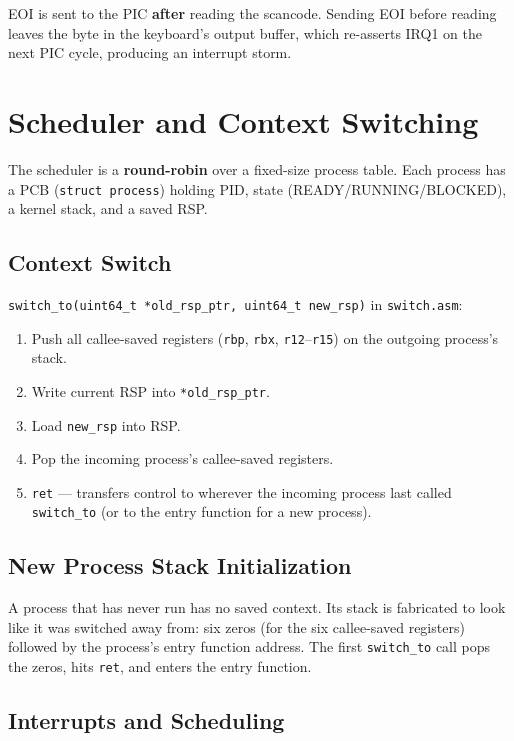 \documentclass[12pt,a4paper]{article}
\begin{document}
EOI is sent to the PIC \textbf{after} reading the scancode. Sending EOI before reading leaves the byte in the keyboard's output buffer, which re-asserts IRQ1 on the next PIC cycle, producing an interrupt storm.

\section{Scheduler and Context Switching}

The scheduler is a \textbf{round-robin} over a fixed-size process table. Each process has a PCB (\texttt{struct process}) holding PID, state (READY/RUNNING/BLOCKED), a kernel stack, and a saved RSP.

\subsection{Context Switch}

\texttt{switch\_to(uint64\_t *old\_rsp\_ptr, uint64\_t new\_rsp)} in \texttt{switch.asm}:

\begin{enumerate}
    \item Push all callee-saved registers (\texttt{rbp}, \texttt{rbx}, \texttt{r12}--\texttt{r15}) on the outgoing process's stack.
    \item Write current RSP into \texttt{*old\_rsp\_ptr}.
    \item Load \texttt{new\_rsp} into RSP.
    \item Pop the incoming process's callee-saved registers.
    \item \texttt{ret} --- transfers control to wherever the incoming process last called \texttt{switch\_to} (or to the entry function for a new process).
\end{enumerate}

\subsection{New Process Stack Initialization}

A process that has never run has no saved context. Its stack is fabricated to look like it was switched away from: six zeros (for the six callee-saved registers) followed by the process's entry function address. The first \texttt{switch\_to} call pops the zeros, hits \texttt{ret}, and enters the entry function.

\subsection{Interrupts and Scheduling}
\end{document}
